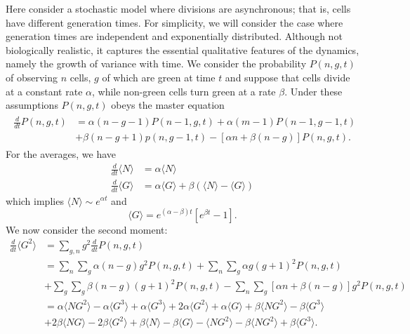 \documentclass{article}
\begin{document}
Here consider a stochastic model where divisions are asynchronous; that is, cells have different generation times. For simplicity, we will consider the case where generation times are independent and exponentially distributed. Although not biologically realistic, it captures the essential qualitative features of the dynamics, namely the growth of variance with time. We consider the probability $P(n,g,t)$ of observing $n$ cells, $g$ of which are green at time $t$ and suppose that cells divide at a constant rate $\alpha$, while non-green cells turn green at a rate $\beta$. Under these assumptions $P(n,g,t)$ obeys the master equation 
\begin{align}
\begin{split}
\frac{d}{dt}P(n,g,t) &= \alpha(n-g-1)P(n-1,g,t) + \alpha (m-1)P(n-1,g-1,t) \\
&+ \beta (n-g+1)p(n,g-1,t)- \left[\alpha n + \beta (n-g)  \right]P(n,g,t).
\end{split}
\end{align}
For the averages, we have
\begin{align}
\frac{d}{dt}\langle N  \rangle &= \alpha\langle N  \rangle \\
\frac{d}{dt}\langle G  \rangle &= \alpha\langle G  \rangle + \beta(\langle N\rangle - \langle  G\rangle)  
\end{align}
which implies $\langle N  \rangle  \sim e^{\alpha t}$ and 
\begin{equation}
\langle G \rangle = e^{(\alpha-\beta)t} \left[e^{\beta t} - 1\right].
\end{equation}
We now consider the second moment:
\begin{align}
\frac{d}{dt}\langle  G^2\rangle  &= \sum_{g,n} g^2 \frac{d}{dt}P(n,g,t)\\
&= \sum_n \sum_g \alpha (n-g) g^2 P(n,g,t) + \sum_n \sum_g \alpha g (g+1)^2 P(n,g,t)\\
&+ \sum_g \sum_g \beta (n-g)(g+1)^2 P(n,g,t) - \sum_n\sum_g \left[\alpha n + \beta(n-g) \right] g^2 P(n,g,t)\\
&= \alpha \langle  N G^2\rangle - \alpha \langle G^3 \rangle  + \alpha \langle  G^3\rangle 
  + 2 \alpha \langle  G^2\rangle  + \alpha \langle G \rangle  + \beta \langle N G^2 \rangle  - \beta \langle G^3 \rangle \\
&+ 2\beta \langle N G \rangle  - 2 \beta \langle G^2 \rangle  + \beta \langle  N\rangle  - \beta \langle  G\rangle 
 - \langle N G^2 \rangle - \beta \langle  N G^2\rangle  + \beta \langle G^3\rangle. 
\end{align}
\end{document}
